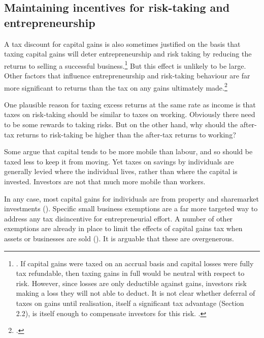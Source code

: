 \subsection{Maintaining incentives for risk-taking and entrepreneurship}\label{subsubsec:maintain-incentives-for-risk-taking}
A tax discount for capital gains is also sometimes justified on the basis that taxing capital gains will deter entrepreneurship and risk taking by reducing the returns to selling a successful business.\footnote{\textcite[][8--11]{ClemensLammamLo2014}. If capital gains were taxed on an accrual basis and capital losses were fully tax refundable, then taxing gains in full would be neutral with respect to risk. However, since losses are only deductible against gains, investors risk making a loss they will not able to deduct. It is not clear whether deferral of taxes on gains until realisation, itself a significant tax advantage (Section 2.2), is itself enough to compensate investors for this risk. \textcites[8]{Burman2009}[130]{ProductivityCommission2004FirstHomeOwnership}.} 
But this effect is unlikely to be large. Other factors that influence entrepreneurship and risk-taking behaviour are far more significant to returns than the tax on any gains ultimately made.\footcite[][75]{Burman1999} 

One plausible reason for taxing excess returns at the same rate as income is that taxes on risk-taking should be similar to taxes on working. Obviously there need to be some rewards to taking risks. But on the other hand, why should the after-tax returns to risk-taking be higher than the after-tax returns to working? 

Some argue that capital tends to be more mobile than labour, and so should be taxed less to keep it from moving. Yet taxes on savings by individuals are generally levied where the individual lives, rather than where the capital is invested. Investors are not that much more mobile than workers.

In any case, most capital gains for individuals are from property and sharemarket investments (). Specific small business exemptions are a far more targeted way to address any tax disincentive for entrepreneurial effort. A number of other exemptions are already in place to limit the effects of capital gains tax when assets or businesses are sold (). It is arguable that these are overgenerous. 


